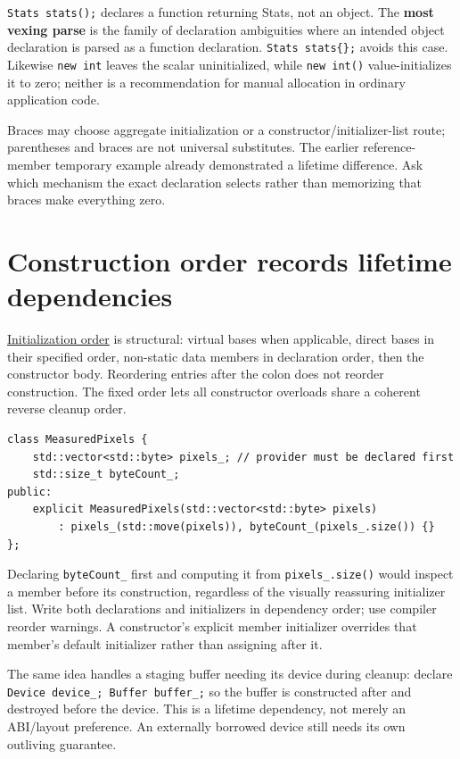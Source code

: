 \texttt{Stats\ stats();} declares a function returning Stats, not an object. The \textbf{most vexing parse} is the family of declaration ambiguities where an intended object declaration is parsed as a function declaration. \texttt{Stats\ stats\{\};} avoids this case. Likewise \texttt{new\ int} leaves the scalar uninitialized, while \texttt{new\ int()} value-initializes it to zero; neither is a recommendation for manual allocation in ordinary application code.

Braces may choose aggregate initialization or a constructor/initializer-list route; parentheses and braces are not universal substitutes. The earlier reference-member temporary example already demonstrated a lifetime difference. Ask which mechanism the exact declaration selects rather than memorizing that braces make everything zero.

\section{Construction order records lifetime dependencies}\label{05-engine-i-ch003-construction-order-records-lifetime-dependencies}

\hyperref[appendix-3cb49709605a]{Initialization order} is structural: virtual bases when applicable, direct bases in their specified order, non-static data members in declaration order, then the constructor body. Reordering entries after the colon does not reorder construction. The fixed order lets all constructor overloads share a coherent reverse cleanup order.

\begin{verbatim}
class MeasuredPixels {
    std::vector<std::byte> pixels_; // provider must be declared first
    std::size_t byteCount_;
public:
    explicit MeasuredPixels(std::vector<std::byte> pixels)
        : pixels_(std::move(pixels)), byteCount_(pixels_.size()) {}
};
\end{verbatim}

Declaring \texttt{byteCount\_} first and computing it from \texttt{pixels\_.size()} would inspect a member before its construction, regardless of the visually reassuring initializer list. Write both declarations and initializers in dependency order; use compiler reorder warnings. A constructor's explicit member initializer overrides that member's default initializer rather than assigning after it.

The same idea handles a staging buffer needing its device during cleanup: declare \texttt{Device\ device\_;\ Buffer\ buffer\_;} so the buffer is constructed after and destroyed before the device. This is a lifetime dependency, not merely an ABI/layout preference. An externally borrowed device still needs its own outliving guarantee.

